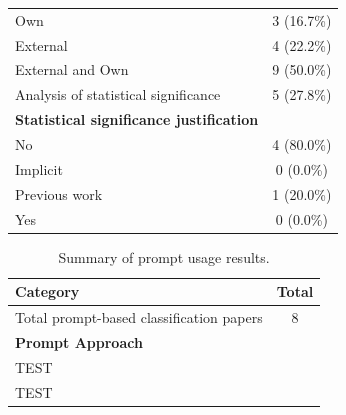 \documentclass[a4paper]{article}
\begin{document}
\begin{table}[H]
\begin{tabularx}{\textwidth}{|X|c|}
		\hspace{3mm} Own & 3 (16.7\%) \\
		\hspace{3mm} External & 4 (22.2\%)\\
		\hspace{3mm} External and Own & 9 (50.0\%) \\
		Analysis of statistical significance & 5 (27.8\%) \\
		\textbf{Statistical significance justification}&\\
		\hspace{3mm} No & 4 (80.0\%)  \\
		\hspace{3mm} Implicit & 0 (0.0\%) \\
		\hspace{3mm} Previous work & 1 (20.0\%) \\
		\hspace{3mm} Yes & 0 (0.0\%)  \\
		\hline
	\end{tabularx}
	\label{table:mapping_results}
\end{table}

\begin{table}[H]
	\caption{Summary of prompt usage results.}
	\begin{tabularx}{\textwidth}{|X|c|}
		\hline
		\textbf{Category} & \textbf{Total} \\
		\hline
		Total prompt-based classification papers & 8 \\
		\hline
		\textbf{Prompt Approach} & \\
		\hspace{3mm}  TEST&  \\
		\hspace{3mm}  TEST& \\
		\hline
	\end{tabularx}
	\label{table:prompt_results}
\end{table}

\newpage 
\printbibliography[heading=bibintoc]
\end{document}
